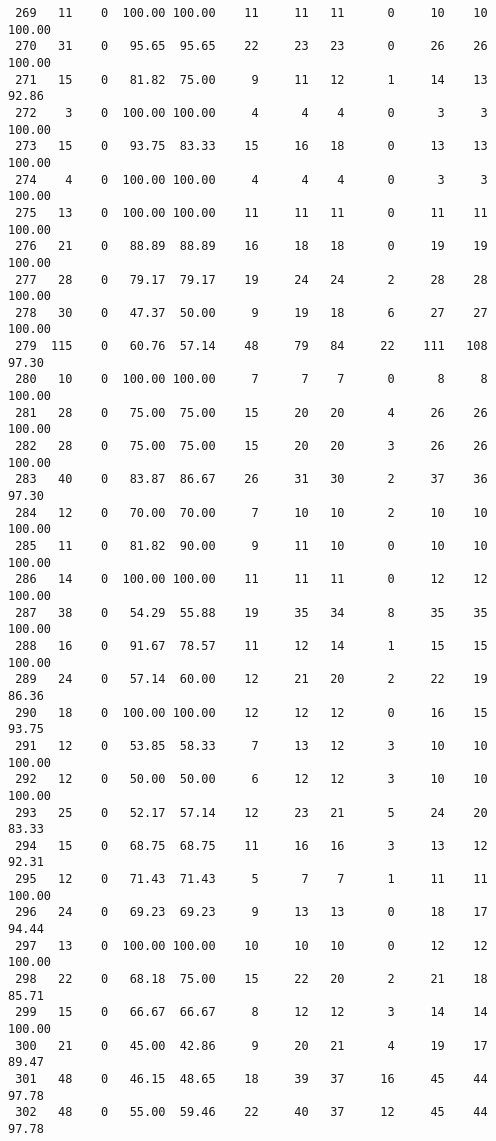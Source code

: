 \begin{verbatim}
 269   11    0  100.00 100.00    11     11   11      0     10    10   100.00
 270   31    0   95.65  95.65    22     23   23      0     26    26   100.00
 271   15    0   81.82  75.00     9     11   12      1     14    13    92.86
 272    3    0  100.00 100.00     4      4    4      0      3     3   100.00
 273   15    0   93.75  83.33    15     16   18      0     13    13   100.00
 274    4    0  100.00 100.00     4      4    4      0      3     3   100.00
 275   13    0  100.00 100.00    11     11   11      0     11    11   100.00
 276   21    0   88.89  88.89    16     18   18      0     19    19   100.00
 277   28    0   79.17  79.17    19     24   24      2     28    28   100.00
 278   30    0   47.37  50.00     9     19   18      6     27    27   100.00
 279  115    0   60.76  57.14    48     79   84     22    111   108    97.30
 280   10    0  100.00 100.00     7      7    7      0      8     8   100.00
 281   28    0   75.00  75.00    15     20   20      4     26    26   100.00
 282   28    0   75.00  75.00    15     20   20      3     26    26   100.00
 283   40    0   83.87  86.67    26     31   30      2     37    36    97.30
 284   12    0   70.00  70.00     7     10   10      2     10    10   100.00
 285   11    0   81.82  90.00     9     11   10      0     10    10   100.00
 286   14    0  100.00 100.00    11     11   11      0     12    12   100.00
 287   38    0   54.29  55.88    19     35   34      8     35    35   100.00
 288   16    0   91.67  78.57    11     12   14      1     15    15   100.00
 289   24    0   57.14  60.00    12     21   20      2     22    19    86.36
 290   18    0  100.00 100.00    12     12   12      0     16    15    93.75
 291   12    0   53.85  58.33     7     13   12      3     10    10   100.00
 292   12    0   50.00  50.00     6     12   12      3     10    10   100.00
 293   25    0   52.17  57.14    12     23   21      5     24    20    83.33
 294   15    0   68.75  68.75    11     16   16      3     13    12    92.31
 295   12    0   71.43  71.43     5      7    7      1     11    11   100.00
 296   24    0   69.23  69.23     9     13   13      0     18    17    94.44
 297   13    0  100.00 100.00    10     10   10      0     12    12   100.00
 298   22    0   68.18  75.00    15     22   20      2     21    18    85.71
 299   15    0   66.67  66.67     8     12   12      3     14    14   100.00
 300   21    0   45.00  42.86     9     20   21      4     19    17    89.47
 301   48    0   46.15  48.65    18     39   37     16     45    44    97.78
 302   48    0   55.00  59.46    22     40   37     12     45    44    97.78

\end{verbatim}
